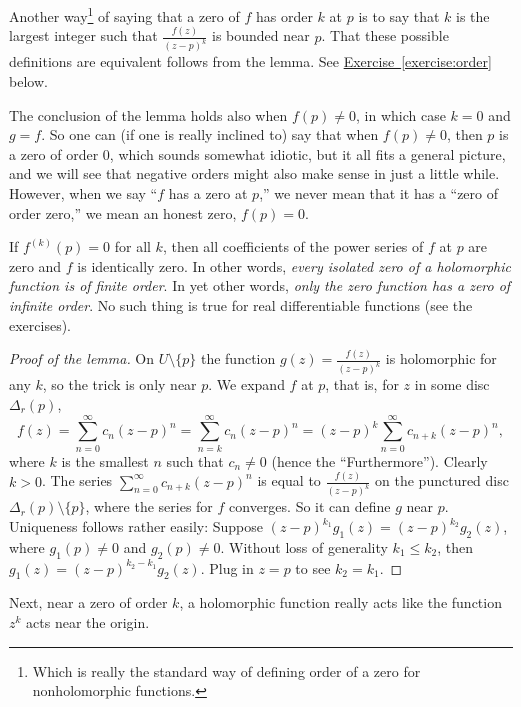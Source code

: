 \documentclass[12pt,openany]{book}
\newcommand{\myquote}[1]{``#1''}
\theoremstyle{plain}
\theoremstyle{remark}
\theoremstyle{definition}
\theoremstyle{exercise}
\theoremstyle{example}
\newcommand{\exerciseref}[1]{\hyperref[#1]{Exercise~\ref*{#1}}}
\begin{document}
Another way\footnote{Which is really the standard way of defining order of a
zero for nonholomorphic functions.}
of saying that a zero of $f$ has order $k$ at $p$ is to say that
$k$ is the largest integer such that $\frac{f(z)}{{(z-p)}^{k}}$ is bounded
near $p$.  That these possible definitions are equivalent
follows from the lemma.  See \exerciseref{exercise:order} below.

The conclusion of the lemma holds also when $f(p) \not= 0$,
in which case
$k=0$ and $g = f$.  So one can (if one is really inclined to)
say that when $f(p) \not= 0$, then $p$ is
a zero of order $0$, which sounds somewhat idiotic, but it all fits a general
picture, and we will see that negative orders might also make sense
in just a little while.
However, when we say \myquote{$f$ has a zero at $p$,}
we never mean that it has a
\myquote{zero of order zero,} we mean an honest zero, $f(p) = 0$.

If $f^{(k)}(p) = 0$
for all $k$, then all coefficients of the power series of $f$ at $p$ are
zero and $f$ is identically zero.  In other words, \emph{every isolated
zero of a holomorphic function is of finite order}.
In yet other words, \emph{only the zero function has a zero of infinite order}.
No such thing is true for real differentiable functions (see the exercises).

\begin{proof}[Proof of the lemma]
On $U \setminus \{ p \}$ the function $g(z) = \frac{f(z)}{{(z-p)}^k}$ is
holomorphic for any $k$, so the trick is only near $p$.  We expand $f$ at
$p$,
that is, for $z$ in some disc $\Delta_r(p)$,
\begin{equation*}
f(z) =
\sum_{n=0}^\infty c_n {(z-p)}^n =
\sum_{n=k}^\infty c_n {(z-p)}^n 
= {(z-p)}^k
\sum_{n=0}^\infty c_{n+k} {(z-p)}^{n} ,
\end{equation*}
where $k$ is the smallest $n$ such that $c_n \not= 0$
(hence the \myquote{Furthermore}).
Clearly $k > 0$.
The series $\sum_{n=0}^\infty c_{n+k}{(z-p)}^n$
is equal to $\frac{f(z)}{{(z-p)}^k}$ on
the punctured disc $\Delta_r(p)\setminus \{ p \}$, where the series
for $f$ converges.
So it can define $g$ near $p$.  Uniqueness follows rather easily:
Suppose ${(z-p)}^{k_1} g_1(z) = {(z-p)}^{k_2} g_2(z)$, where
$g_1(p) \not= 0$ and $g_2(p) \not= 0$.
Without loss of generality
$k_1 \leq k_2$, then 
$g_1(z) = {(z-p)}^{k_2-k_1} g_2(z)$.  Plug in $z=p$ to see $k_2 =
k_1$.
\end{proof}

Next, near a zero of order $k$, a holomorphic function really acts like the
function $z^k$ acts near the origin.
\end{document}
